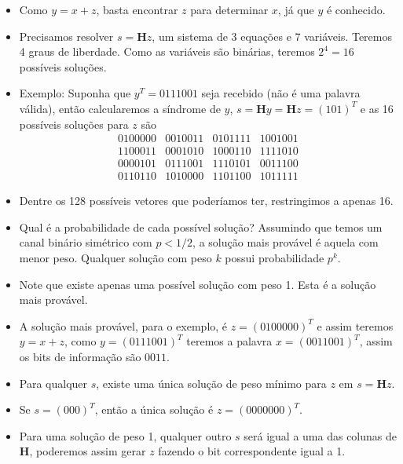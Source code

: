 \begin{frame}[allowframebreaks]
\begin{itemize}
\begin{equation}
	\end{equation}
  \item Como $y=x+z$, basta encontrar $z$ para determinar $x$, já que $y$ é conhecido.
  \item Precisamos resolver $s = \mathbf{H} z$, um sistema de 3 equações e 7 variáveis. Teremos 4 graus de liberdade.
	Como as variáveis são binárias, teremos $2^{4} = 16$ possíveis soluções.
  \item Exemplo: Suponha que $y^T = 0111001$ seja recebido (não é uma palavra válida), então calcularemos a
	síndrome de $y$, $s = \mathbf{H} y = \mathbf{H} z = (101)^T$ e as 16 possíveis soluções para $z$ são
	\begin{equation}
	\begin{matrix}
	0100000 & 0010011 & 0101111 & 1001001 \\
	1100011 & 0001010 & 1000110 & 1111010 \\
	0000101 & 0111001 & 1110101 & 0011100 \\
	0110110 & 1010000 & 1101100 & 1011111
	\end{matrix}
	\end{equation}
  \item Dentre os 128 possíveis vetores que poderíamos ter, restringimos a apenas 16.
  \item Qual é a probabilidade de cada possível solução? Assumindo que temos um canal binário
	simétrico com $p < 1/2$, a solução mais provável é aquela com menor peso. 
	Qualquer solução com peso $k$ possui probabilidade $p^k$.
  \item Note que existe apenas uma possível solução com peso 1. Esta é a solução mais provável.
  \item A solução mais provável, para o exemplo, é $z = (0100000)^T$ e assim teremos
	$y = x + z$, como $y = (0111001)^T$ teremos a palavra $x = (0011001)^T$, assim os
	bits de informação são $0011$.
  \item Para qualquer $s$, existe uma única solução de peso mínimo para $z$ em $s = \mathbf{H} z$.
  \item Se $s = (000)^T$, então a única solução é $z=(0000000)^T$.
  \item Para uma solução de peso 1, qualquer outro $s$ será igual a uma das colunas de $\mathbf{H}$,
	poderemos assim gerar $z$ fazendo o bit correspondente igual a 1.
  \end{itemize}

\end{frame}

